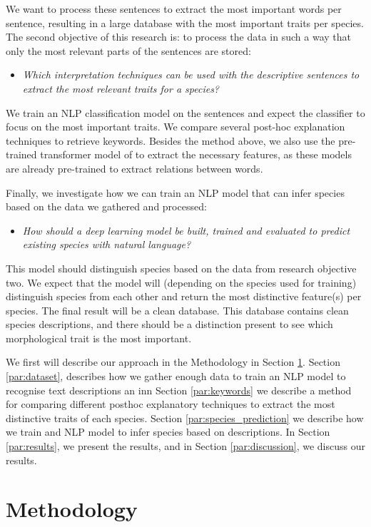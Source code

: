 \documentclass[a4paper, 12pt, oneside]{book} %
\begin{document}
We want to process these sentences to extract the most important words per sentence, resulting in a large database with the most important traits per species.
The second objective of this research is: to process the data in such a way that only the most relevant parts of the sentences are stored:
\begin{itemize}
    \item \emph{Which interpretation techniques can be used with the descriptive sentences to extract the most relevant traits for a species?}
\end{itemize}
We train an NLP classification model on the sentences and expect the classifier to focus on the most important traits.
We compare several post-hoc explanation techniques to retrieve keywords. 
Besides the method above, we also use the pre-trained transformer model of \textcite{wolf_huggingfaces_2020} to extract the necessary features, as these models are already pre-trained to extract relations between words.

Finally, we investigate how we can train an NLP model that can infer species based on the data we gathered and processed:
\begin{itemize}
    \item \emph{How should a deep learning model be built, trained and evaluated to predict existing species with natural language?}
\end{itemize}
This model should distinguish species based on the data from research objective two.
We expect that the model will (depending on the species used for training) distinguish species from each other and return the most distinctive feature(s) per species. 
The final result will be a clean database.
This database contains clean species descriptions, and there should be a distinction present to see which morphological trait is the most important.

We first will describe our approach in the Methodology in Section \ref{par:methodoly}.
Section \ref{par:dataset}, describes how we gather enough data to train an NLP model to recognise text descriptions an inn Section \ref{par:keywords} we describe a method for comparing different posthoc explanatory techniques to extract the most distinctive traits of each species.
Section \ref{par:species_prediction} we describe how we train and NLP model to infer species based on descriptions.
In Section \ref{par:results}, we present the results, and in Section \ref{par:discussion}, we discuss our results.

\newpage
\section{Methodology} \label{par:methodoly}
\end{document}

